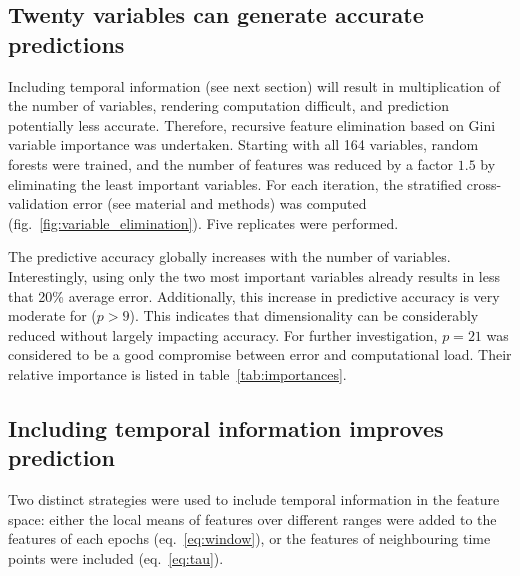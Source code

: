\subsection{Twenty variables can generate accurate predictions}
Including temporal information (see next section) will result in multiplication of the number of variables, rendering computation difficult, and prediction potentially less accurate.
Therefore, recursive feature elimination\cite{menze_comparison_2009} based on
Gini variable importance was undertaken.
Starting with all 164 variables, random forests were trained, and the number of features was reduced by a factor $1.5$  by eliminating the least important variables.
For each iteration, the stratified cross-validation error (see material and methods) was computed (fig.~\ref{fig:variable_elimination}). Five replicates were performed.


The predictive accuracy globally increases with the number of variables.
Interestingly, using only the two most important variables already results in less that 20\% average error.
Additionally, this increase in predictive accuracy is very moderate for ($p>9$). This indicates that dimensionality can be considerably reduced without largely impacting accuracy.
For further investigation, $p=21$ was considered to be a good compromise between error and computational load. Their relative importance is listed in table~\ref{tab:importances}.


\subsection{Including temporal information improves prediction}
Two distinct strategies were used to include temporal information in the feature space:
either the local means of features over different ranges were added to the features
of each epochs (eq.~\ref{eq:window}),
or the features of neighbouring time points were included (eq.~\ref{eq:tau}).

